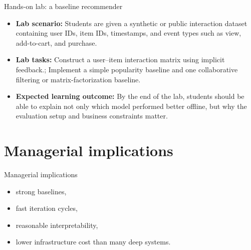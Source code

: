 \documentclass[aspectratio=169]{beamer}
\begin{document}
\begin{frame}{Hands-on lab: a baseline recommender}
  \begin{itemize}
    \item \textbf{Lab scenario:} Students are given a synthetic or public interaction dataset containing user IDs, item IDs, timestamps, and event types such as view, add-to-cart, and purchase.
    \item \textbf{Lab tasks:} Construct a user--item interaction matrix using implicit feedback.; Implement a simple popularity baseline and one collaborative filtering or matrix-factorization baseline.
    \item \textbf{Expected learning outcome:} By the end of the lab, students should be able to explain not only which model performed better offline, but why the evaluation setup and business constraints matter.
  \end{itemize}
\end{frame}

\section{Managerial implications}

\begin{frame}{Managerial implications}
  \begin{itemize}
    \item strong baselines,
    \item fast iteration cycles,
    \item reasonable interpretability,
    \item lower infrastructure cost than many deep systems.
  \end{itemize}
\end{frame}
\end{document}
